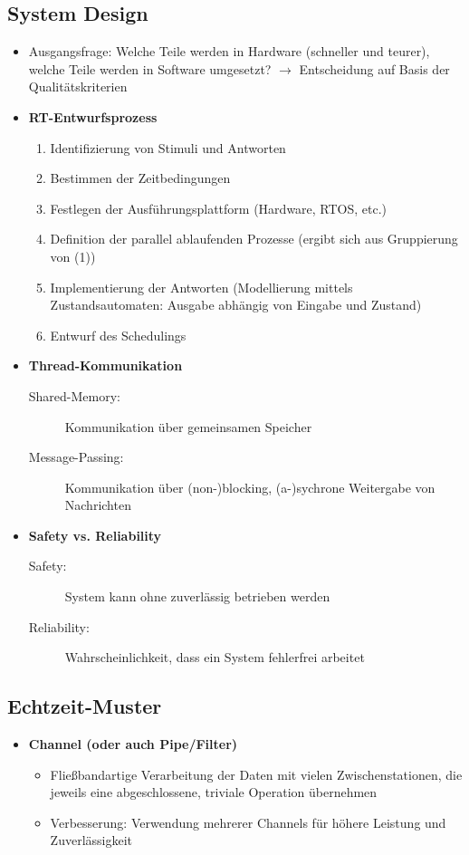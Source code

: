 \subsection{System Design}
\begin{itemize}
	\item Ausgangsfrage: Welche Teile werden in Hardware (schneller und teurer), welche Teile werden in Software umgesetzt? \(\rightarrow\) Entscheidung auf Basis der Qualitätskriterien
	\item \textbf{RT-Entwurfsprozess}
	\begin{enumerate}
		\item Identifizierung von Stimuli und Antworten
		\item Bestimmen der Zeitbedingungen
		\item Festlegen der Ausführungsplattform (Hardware, RTOS, etc.)
		\item Definition der parallel ablaufenden Prozesse (ergibt sich aus Gruppierung von (1))
		\item Implementierung der Antworten (Modellierung mittels Zustandsautomaten: Ausgabe abhängig von Eingabe und Zustand)
		\item Entwurf des Schedulings
	\end{enumerate}
	\item \textbf{Thread-Kommunikation}
	\begin{description}
		\item[Shared-Memory:] Kommunikation über gemeinsamen Speicher
		\item [Message-Passing:] Kommunikation über (non-)blocking, (a-)sychrone Weitergabe von Nachrichten
	\end{description}
	\item \textbf{Safety vs. Reliability} %
	\begin{description}
		\item[Safety:] System kann ohne zuverlässig betrieben werden
		\item[Reliability:] Wahrscheinlichkeit, dass ein System fehlerfrei arbeitet
	\end{description}
\end{itemize}


\subsection{Echtzeit-Muster}
\begin{itemize}
	\item \textbf{Channel (oder auch Pipe/Filter)}
	\begin{itemize}
		\item Fließbandartige Verarbeitung der Daten mit vielen Zwischenstationen, die jeweils eine abgeschlossene, triviale Operation übernehmen
		\item Verbesserung: Verwendung mehrerer Channels für höhere Leistung und Zuverlässigkeit
	\end{itemize}
\end{itemize}



